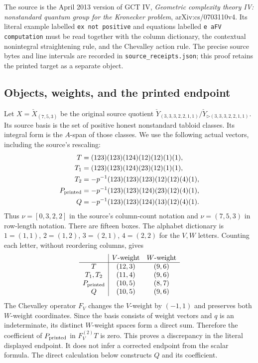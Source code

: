 The source is the April 2013 version of GCT IV,
\emph{Geometric complexity theory IV: nonstandard quantum group for the
Kronecker problem}, arXiv:cs/0703110v4. Its literal example labelled
\texttt{ex not positive} and equations labelled \texttt{e aFV computation}
must be read together with the column dictionary, the contextual
nonintegral straightening rule, and the Chevalley action rule. The
precise source bytes and line intervals are recorded in
\texttt{source\_receipts.json}; this proof retains the printed target
as a separate object.

\subsection{Objects, weights, and the printed endpoint}

Let $X=\check X_{(7,5,3)}$ be the original source quotient
$\check Y_{(3,3,3,2,2,1,1)}/\check Y_{\triangleright(3,3,3,2,2,1,1)}$.
Its source basis is the set of positive honest nonstandard tabloid
classes. Its integral form is the $A$-span of those classes. We use
the following actual vectors, including the source's rescaling:
\begin{align*}
 T&=(123)(123)(124)(12)(12)(1)(1),\\
 T_1&=(123)(123)(124)(23)(12)(1)(1),\\
 T_2&=-p^{-1}(123)(123)(123)(12)(12)(4)(1),\\
 P_{\rm printed}&=-p^{-1}(123)(123)(124)(23)(12)(4)(1),\\
 Q&=-p^{-1}(123)(123)(124)(13)(12)(4)(1).
\end{align*}
Thus $\nu=[0,3,2,2]$ in the source's column-count notation and
$\nu=(7,5,3)$ in row-length notation. There are fifteen boxes.
The alphabet dictionary is
$1=(1,1)$, $2=(1,2)$, $3=(2,1)$, $4=(2,2)$ for the $V,W$ letters.
Counting each letter, without reordering columns, gives
\[
\begin{array}{c|cc}
 &V\text{-weight}&W\text{-weight}\\\hline
T&(12,3)&(9,6)\\
T_1,T_2&(11,4)&(9,6)\\
P_{\rm printed}&(10,5)&(8,7)\\
Q&(10,5)&(9,6)
\end{array}
\]
The Chevalley operator $F_V$ changes the $V$-weight by $(-1,1)$ and
preserves both $W$-weight coordinates. Since the basis consists of
weight vectors and $q$ is an indeterminate, its distinct $W$-weight
spaces form a direct sum. Therefore the coefficient of
$P_{\rm printed}$ in $F_V^{(2)}T$ is zero. This proves a discrepancy
in the literal displayed endpoint. It does not infer a corrected
endpoint from the scalar formula. The direct calculation below
constructs $Q$ and its coefficient.

